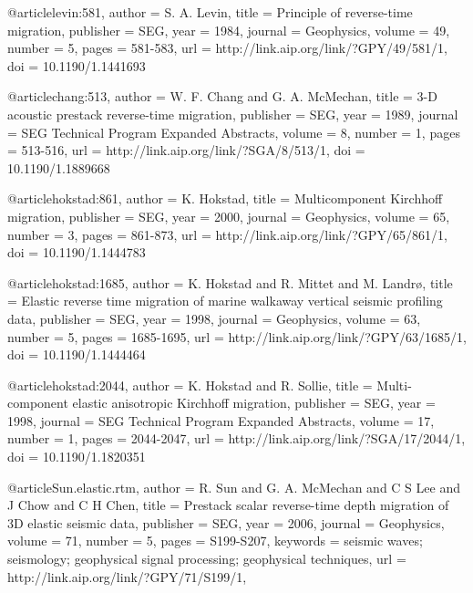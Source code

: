 @article{levin:581,
  author =	 {S. A. Levin},
  title =	 {Principle of reverse-time migration},
  publisher =	 {SEG},
  year =	 1984,
  journal =	 {Geophysics},
  volume =	 49,
  number =	 5,
  pages =	 {581-583},
  url =		 {http://link.aip.org/link/?GPY/49/581/1},
  doi =		 {10.1190/1.1441693}
}

@article{chang:513,
  author =	 {W. F. Chang and G. A. McMechan},
  title =	 {3-{D} acoustic prestack reverse-time migration},
  publisher =	 {SEG},
  year =	 1989,
  journal =	 {SEG Technical Program Expanded Abstracts},
  volume =	 8,
  number =	 1,
  pages =	 {513-516},
  url =		 {http://link.aip.org/link/?SGA/8/513/1},
  doi =		 {10.1190/1.1889668}
}

@article{hokstad:861,
  author =	 {K. Hokstad},
  title =	 {Multicomponent {K}irchhoff migration},
  publisher =	 {SEG},
  year =	 2000,
  journal =	 {Geophysics},
  volume =	 65,
  number =	 3,
  pages =	 {861-873},
  url =		 {http://link.aip.org/link/?GPY/65/861/1},
  doi =		 {10.1190/1.1444783}
}

@article{hokstad:1685,
  author =	 {K. Hokstad and R. Mittet and M. Landr\o},
  title =	 {Elastic reverse time migration of marine walkaway
                  vertical seismic profiling data},
  publisher =	 {SEG},
  year =	 1998,
  journal =	 {Geophysics},
  volume =	 63,
  number =	 5,
  pages =	 {1685-1695},
  url =		 {http://link.aip.org/link/?GPY/63/1685/1},
  doi =		 {10.1190/1.1444464}
}

@article{hokstad:2044,
  author =	 {K. Hokstad and R. Sollie},
  title =	 {Multi-component elastic anisotropic {K}irchhoff
                  migration},
  publisher =	 {SEG},
  year =	 1998,
  journal =	 {SEG Technical Program Expanded Abstracts},
  volume =	 17,
  number =	 1,
  pages =	 {2044-2047},
  url =		 {http://link.aip.org/link/?SGA/17/2044/1},
  doi =		 {10.1190/1.1820351}
}

@article{Sun.elastic.rtm,
  author =	 {R. Sun and G. A. McMechan and C S Lee
                  and J Chow and C H Chen},
  title =	 {Prestack scalar reverse-time depth migration of {3D}
                  elastic seismic data},
  publisher =	 {SEG},
  year =	 2006,
  journal =	 {Geophysics},
  volume =	 71,
  number =	 5,
  pages =	 {S199-S207},
  keywords =	 {seismic waves; seismology; geophysical signal
                  processing; geophysical techniques},
  url =		 {http://link.aip.org/link/?GPY/71/S199/1},
}

